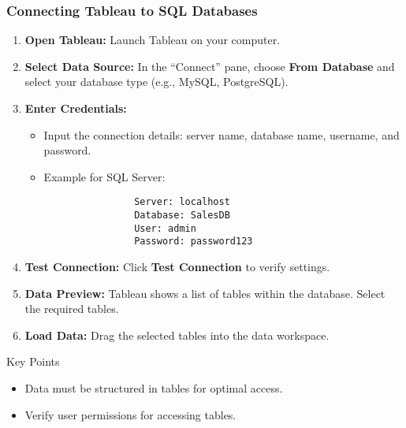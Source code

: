 \documentclass[aspectratio=169]{beamer}
\begin{document}
\begin{frame}[fragile]
    \frametitle{Connecting Tableau to SQL Databases}
    \begin{enumerate}
        \item \textbf{Open Tableau:} Launch Tableau on your computer.
        \item \textbf{Select Data Source:} In the “Connect” pane, choose \textbf{From Database} and select your database type (e.g., MySQL, PostgreSQL).
        \item \textbf{Enter Credentials:}
        \begin{itemize}
            \item Input the connection details: server name, database name, username, and password.
            \item Example for SQL Server:
                \begin{lstlisting}
                Server: localhost
                Database: SalesDB
                User: admin
                Password: password123
                \end{lstlisting}
        \end{itemize}
        \item \textbf{Test Connection:} Click \textbf{Test Connection} to verify settings.
        \item \textbf{Data Preview:} Tableau shows a list of tables within the database. Select the required tables.
        \item \textbf{Load Data:} Drag the selected tables into the data workspace.
    \end{enumerate}
    
    \begin{block}{Key Points}
        \begin{itemize}
            \item Data must be structured in tables for optimal access.
            \item Verify user permissions for accessing tables.
        \end{itemize}
    \end{block}
\end{frame}
\end{document}
